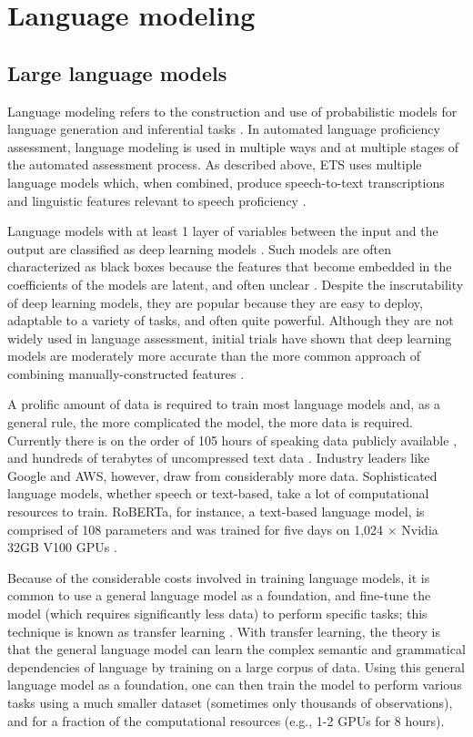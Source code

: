 \documentclass [PhD] {uclathes}
\begin{document}
\section{Language modeling}

\subsection{Large language models}

Language modeling refers to the construction and use of probabilistic models for language generation and inferential tasks \citep{jurafskyspeech}. In automated language proficiency assessment, language modeling is used in multiple ways and at multiple stages of the automated assessment process. As described above, ETS uses multiple language models which, when combined, produce speech-to-text transcriptions and linguistic features relevant to speech proficiency \citep{qian2019automatic}.

Language models with at least 1 layer of variables between the input and the output are classified as deep learning models \citep{goodfellow2016deep}. Such models are often characterized as black boxes because the features that become embedded in the coefficients of the models are latent, and often unclear \citep[e.g.][]{gretter2019automatic}. Despite the inscrutability of deep learning models, they are popular because they are easy to deploy, adaptable to a variety of tasks, and often quite powerful. Although they are not widely used in language assessment, initial trials have shown that deep learning models are moderately more accurate than the more common approach of combining manually-constructed features \citep{chen2018end}.

A prolific amount of data is required to train most language models and, as a general rule, the more complicated the model, the more data is required. Currently there is on the order of 105 hours of speaking data publicly available \citep{galvez2021people}, and hundreds of terabytes of uncompressed text data \citep{iderhoff2023}. Industry leaders like Google and AWS, however, draw from considerably more data. Sophisticated language models, whether speech or text-based, take a lot of computational resources to train. RoBERTa, for instance, a text-based language model, is comprised of 108 parameters and was trained for five days on 1,024 × Nvidia 32GB V100 GPUs \citep{liu2019roberta}.

Because of the considerable costs involved in training language models, it is common to use a general language model as a foundation, and fine-tune the model (which requires significantly less data) to perform specific tasks; this technique is known as transfer learning \citep{jurafskyspeech}. With transfer learning, the theory is that the general language model can learn the complex semantic and grammatical dependencies of language by training on a large corpus of data. Using this general language model as a foundation, one can then train the model to perform various tasks using a much smaller dataset (sometimes only thousands of observations), and for a fraction of the computational resources (e.g., 1-2 GPUs for 8 hours).
\end{document}
